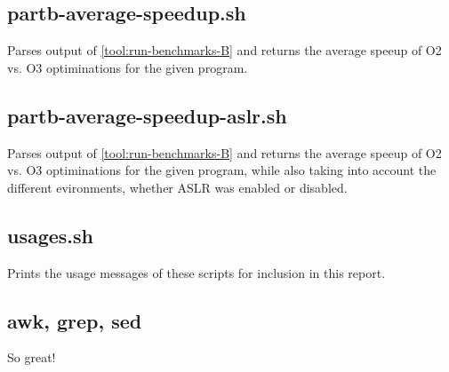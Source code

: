 \documentclass{article}
\begin{document}
\subsection{partb-average-speedup.sh} \label{tool:partb-average-speedup.sh}
Parses output of \ref{tool:run-benchmarks-B} and returns the average speeup of O2 vs. O3 optiminations for the given program.

\subsection{partb-average-speedup-aslr.sh} \label{tool:partb-average-speedup-aslr.sh}
Parses output of \ref{tool:run-benchmarks-B} and returns the average speeup of O2 vs. O3 optiminations for the given program, while also taking into account the different evironments, whether ASLR was enabled or disabled.

\begin{framed}
    \label{lst:minions}
    
\end{framed}

\subsection{usages.sh} \label{tool:usages}
Prints the usage messages of these scripts for inclusion in this report.
\begin{framed}
    \label{lst:usages}
    
\end{framed}


\subsection{awk, grep, sed}
So great!
\end{document}
